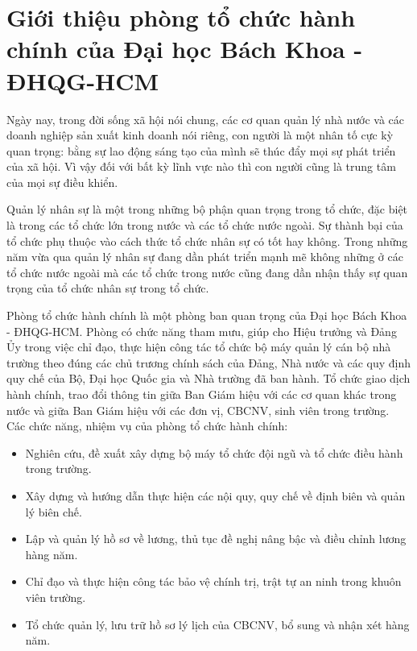 \section{Giới thiệu phòng tổ chức hành chính của Đại học Bách Khoa - ĐHQG-HCM}
Ngày nay, trong đời sống xã hội nói chung, các cơ quan quản lý nhà nước và các doanh nghiệp sản xuất kinh doanh nói riêng, con người là một nhân tố cực kỳ quan trọng: bằng sự lao động sáng tạo của mình sẽ thúc đẩy mọi sự phát triển của xã hội. Vì vậy đối với bất kỳ lĩnh vực nào thì con người cũng là trung tâm của mọi sự điều khiển.

Quản lý nhân sự là một trong những bộ phận quan trọng trong tổ chức, đặc biệt là trong các tổ chức lớn trong nước và các tổ chức nước ngoài. Sự thành bại của tổ chức phụ thuộc vào cách thức tổ chức nhân sự có tốt hay không. Trong những năm vừa qua quản lý nhân sự đang dần phát triển mạnh mẽ không những ở các tổ chức nước ngoài mà các tổ chức trong nước cũng đang dần nhận thấy sự quan trọng của tổ chức nhân sự trong tổ chức.

Phòng tổ chức hành chính là một phòng ban quan trọng của Đại học Bách Khoa - ĐHQG-HCM. Phòng có chức năng tham mưu, giúp cho Hiệu trưởng và Đảng Ủy trong việc chỉ đạo, thực hiện công tác tổ chức bộ máy quản lý cán bộ nhà trường theo đúng các chủ trương chính sách của Đảng, Nhà nước và các quy định quy chế của Bộ, Đại học Quốc gia và Nhà trường đã ban hành. Tổ chức giao dịch hành chính, trao đổi thông tin giữa Ban Giám hiệu với các cơ quan khác trong nước và giữa Ban Giám hiệu với các đơn vị, CBCNV, sinh viên trong trường.\\

Các chức năng, nhiệm vụ của phòng tổ chức hành chính:
\begin{itemize}
    \item Nghiên cứu, đề xuất xây dựng bộ máy tổ chức đội ngũ và tổ chức điều hành trong trường.
    \item Xây dựng và hướng dẫn thực hiện các nội quy, quy chế về định biên và quản lý biên chế.
    \item Lập và quản lý hồ sơ về lương, thủ tục đề nghị nâng bậc và điều chỉnh lương hàng năm.
    \item Chỉ đạo và thực hiện công tác bảo vệ chính trị, trật tự an ninh trong khuôn viên trường.
    \item Tổ chức quản lý, lưu trữ hồ sơ lý lịch của CBCNV, bổ sung và nhận xét hàng năm.
\end{itemize}

